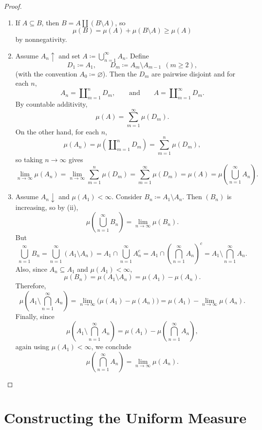 \begin{proof}
	\begin{enumerate}[label=(\roman*)]
		\item If $A\subseteq B$, then $B = A \amalg (B \setminus A)$, so
		\[
			\mu(B) = \mu(A) + \mu(B \setminus A) \ge \mu(A)
		\]
		by nonnegativity.
		
		\item Assume $A_n \uparrow$ and set $A\coloneqq\bigcup_{n=1}^\infty A_n$. Define
		\[
			D_1 \coloneqq A_1,\qquad D_m \coloneqq A_m \setminus A_{m-1}\ \ (m\ge 2),
		\]
		(with the convention $A_0\coloneqq\varnothing$). Then the $D_m$ are pairwise disjoint and for each $n$,
		\[
			A_n = \amalg_{m=1}^n D_m,
			\qquad\text{and}\qquad
			A=\amalg_{m=1}^\infty D_m .
		\]
		By countable additivity,
		\[
			\mu(A)=\sum_{m=1}^\infty \mu(D_m).
		\]
		On the other hand, for each $n$,
		\[
			\mu(A_n)=\mu\!\left(\amalg_{m=1}^n D_m\right)=\sum_{m=1}^n \mu(D_m),
		\]
		so taking $n\to\infty$ gives
		\[
			\lim_{n\to\infty}\mu(A_n)=\lim_{n\to\infty}\sum_{m=1}^n \mu(D_m)=\sum_{m=1}^\infty \mu(D_m)=\mu(A)
			= \mu\!\left(\bigcup_{n=1}^\infty A_n\right).
		\]
		
		\item Assume $A_n \downarrow$ and $\mu(A_1)<\infty$. Consider $B_n \coloneqq A_1 \setminus A_n$.
		Then $(B_n)$ is increasing, so by (ii),
		\[
			\mu\!\left(\bigcup_{n=1}^\infty B_n\right)=\lim_{n\to\infty}\mu(B_n).
		\]
		But
		\[
			\bigcup_{n=1}^\infty B_n
			= \bigcup_{n=1}^\infty (A_1\setminus A_n)
			= A_1 \cap \bigcup_{n=1}^\infty A_n^c
			= A_1 \cap \left(\bigcap_{n=1}^\infty A_n\right)^c
			= A_1 \setminus \bigcap_{n=1}^\infty A_n .
		\]
		Also, since $A_n\subseteq A_1$ and $\mu(A_1)<\infty$,
		\[
			\mu(B_n)=\mu(A_1\setminus A_n)=\mu(A_1)-\mu(A_n).
		\]
		Therefore,
		\[
			\mu\!\left(A_1 \setminus \bigcap_{n=1}^\infty A_n\right)
			= \lim_{n\to\infty}\bigl(\mu(A_1)-\mu(A_n)\bigr)
			= \mu(A_1)-\lim_{n\to\infty}\mu(A_n).
		\]
		Finally, since
		\[
			\mu\!\left(A_1 \setminus \bigcap_{n=1}^\infty A_n\right)=\mu(A_1)-\mu\!\left(\bigcap_{n=1}^\infty A_n\right),
		\]
		again using $\mu(A_1)<\infty$, we conclude
		\[
			\mu\!\left(\bigcap_{n=1}^\infty A_n\right)=\lim_{n\to\infty}\mu(A_n).
		\]
	\end{enumerate}
\end{proof}

\section{Constructing the Uniform Measure}


